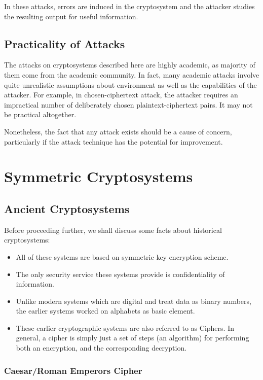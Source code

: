 \documentclass[british]{article}
\begin{document}
In these attacks, errors are induced in the cryptosystem and the attacker
studies the resulting output for useful information.

\subsection{Practicality of Attacks}

The attacks on cryptosystems described here are highly academic, as
majority of them come from the academic community. In fact, many academic
attacks involve quite unrealistic assumptions about environment as
well as the capabilities of the attacker. For example, in chosen-ciphertext
attack, the attacker requires an impractical number of deliberately
chosen plaintext-ciphertext pairs. It may not be practical altogether.

Nonetheless, the fact that any attack exists should be a cause of
concern, particularly if the attack technique has the potential for
improvement.

\vfill{}

\pagebreak{}

\section{Symmetric Cryptosystems}

\subsection{Ancient Cryptosystems}

Before proceeding further, we shall discuss some facts about historical
cryptosystems:
\begin{itemize}
\item All of these systems are based on symmetric key encryption scheme.
\item The only security service these systems provide is confidentiality
of information.
\item Unlike modern systems which are digital and treat data as binary numbers,
the earlier systems worked on alphabets as basic element.
\item These earlier cryptographic systems are also referred to as Ciphers.
In general, a cipher is simply just a set of steps (an algorithm)
for performing both an encryption, and the corresponding decryption.
\end{itemize}

\subsubsection{Caesar/Roman Emperors Cipher}
\end{document}
